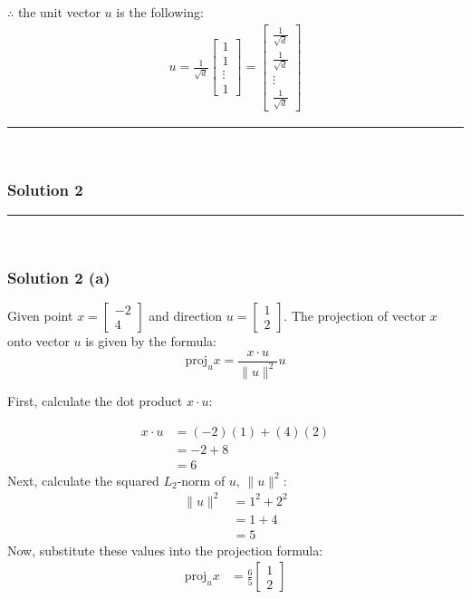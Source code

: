 \documentclass{article}
\begin{document}
\subsubsection*{\normalfont}{$\therefore$ the unit vector $u$ is the following:}
\begin{align*}
    u = \frac{1}{\sqrt{d}} \begin{bmatrix}1 \\ 1 \\ \vdots \\ 1\end{bmatrix} = \begin{bmatrix} \frac{1}{\sqrt{d}} \\ \frac{1}{\sqrt{d}} \\ \vdots \\ \frac{1}{\sqrt{d}} \end{bmatrix}
\end{align*}

\noindent\rule{\textwidth}{0.4pt}\\

\newpage

\subsubsection*{Solution 2}
\noindent\rule{\textwidth}{0.4pt}\\
\subsubsection*{Solution 2 (a)}

Given point $x = \begin{bmatrix}-2 \\ 4\end{bmatrix}$ and direction $u = \begin{bmatrix}1 \\ 2\end{bmatrix}$.
The projection of vector $x$ onto vector $u$ is given by the formula:
$$\text{proj}_u x = \frac{x \cdot u}{\|u\|^2} u$$
\begin{flushleft}
  First, calculate the dot product $x \cdot u$:
\end{flushleft}

\begin{align*}
    x \cdot u &= (-2)(1) + (4)(2) \\
              &= -2 + 8 \\
              &= 6
\end{align*}
Next, calculate the squared $L_2$-norm of $u$, $\|u\|^2$:
\begin{align*}
    \|u\|^2 &= 1^2 + 2^2 \\
            &= 1 + 4 \\
            &= 5
\end{align*}
Now, substitute these values into the projection formula:
\begin{align*}
    \text{proj}_u x &= \frac{6}{5} \begin{bmatrix}1 \\ 2\end{bmatrix} \\
\end{align*}
\end{document}
